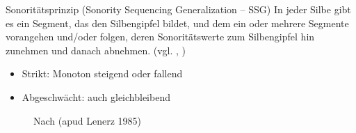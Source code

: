 \begin{frame}


\begin{block}{Sonoritätsprinzip (Sonority Sequencing Generalization -- SSG)}
In jeder Silbe gibt es ein Segment, das den Silbengipfel bildet, und dem ein oder mehrere Segmente vorangehen und/oder folgen, deren Sonoritätswerte zum Silbengipfel hin zunehmen und danach abnehmen. (vgl. \citealt[225]{Hall00a}, \citealt[94]{Ramers08a})
\end{block}

\begin{itemize}
	\item Strikt: Monoton steigend oder fallend
	\item Abgeschwächt: auch gleichbleibend \citep[vgl.][]{Hall00a}

\end{itemize}


\begin{figure}
	\centering
\caption{Nach \citet[93]{Ramers08a} (apud Lenerz 1985)}
\end{figure}


\end{frame}


